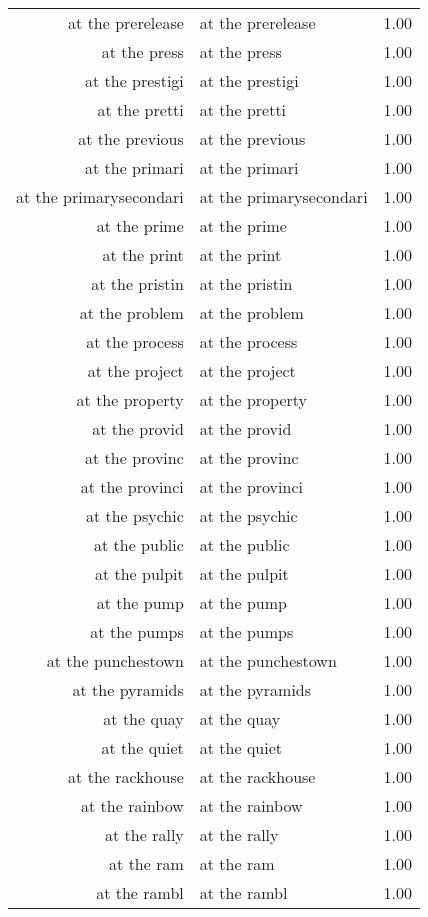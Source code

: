\begin{table}[ht]
\begin{tabular}{rlr}
  at the prerelease & at the prerelease & 1.00 \\ 
  at the press & at the press & 1.00 \\ 
  at the prestigi & at the prestigi & 1.00 \\ 
  at the pretti & at the pretti & 1.00 \\ 
  at the previous & at the previous & 1.00 \\ 
  at the primari & at the primari & 1.00 \\ 
  at the primarysecondari & at the primarysecondari & 1.00 \\ 
  at the prime & at the prime & 1.00 \\ 
  at the print & at the print & 1.00 \\ 
  at the pristin & at the pristin & 1.00 \\ 
  at the problem & at the problem & 1.00 \\ 
  at the process & at the process & 1.00 \\ 
  at the project & at the project & 1.00 \\ 
  at the property & at the property & 1.00 \\ 
  at the provid & at the provid & 1.00 \\ 
  at the provinc & at the provinc & 1.00 \\ 
  at the provinci & at the provinci & 1.00 \\ 
  at the psychic & at the psychic & 1.00 \\ 
  at the public & at the public & 1.00 \\ 
  at the pulpit & at the pulpit & 1.00 \\ 
  at the pump & at the pump & 1.00 \\ 
  at the pumps & at the pumps & 1.00 \\ 
  at the punchestown & at the punchestown & 1.00 \\ 
  at the pyramids & at the pyramids & 1.00 \\ 
  at the quay & at the quay & 1.00 \\ 
  at the quiet & at the quiet & 1.00 \\ 
  at the rackhouse & at the rackhouse & 1.00 \\ 
  at the rainbow & at the rainbow & 1.00 \\ 
  at the rally & at the rally & 1.00 \\ 
  at the ram & at the ram & 1.00 \\ 
  at the rambl & at the rambl & 1.00 \\ 

\end{tabular}
\end{table}
